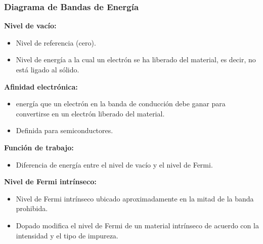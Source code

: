 \documentclass[10pt,t,aspectratio=169]{beamer}
\begin{document}
\begin{frame}[t]
    \frametitle{Diagrama de Bandas de Energía}

    \textbf{Nivel de vacío:}
    \begin{itemize}
        \item Nivel de referencia (cero).
        \item Nivel de energía a la cual un electrón se ha liberado del material, es decir, no está ligado al sólido.
    \end{itemize}
    
    \textbf{Afinidad electrónica:}
    \begin{itemize}
        \item energía que un electrón en la banda de conducción debe ganar para convertirse en un electrón liberado del material.
        \item Definida para semiconductores.
    \end{itemize}

    \textbf{Función de trabajo:}
    \begin{itemize}
        \item Diferencia de energía entre el nivel de vacío y el nivel de Fermi.
    \end{itemize}
    
    \textbf{Nivel de Fermi intrínseco:}
    \begin{itemize}
        \item Nivel de Fermi intrínseco ubicado aproximadamente en la mitad de la banda prohibida.
        \item Dopado modifica el nivel de Fermi de un material intrínseco de acuerdo con la intensidad y el tipo de impureza.
    \end{itemize}
\end{frame}
\end{document}
